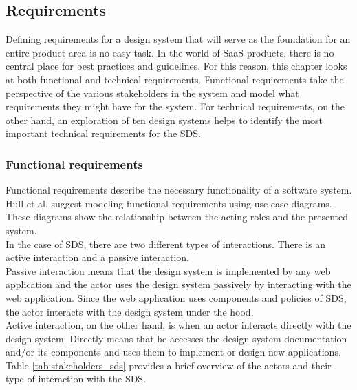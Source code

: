 \subsection{Requirements}
Defining requirements for a design system that will serve as the foundation for an entire product area is no easy task. In the world of SaaS products, there is no central place for best practices and guidelines. For this reason, this chapter looks at both functional and technical requirements. Functional requirements take the perspective of the various stakeholders in the system and model what requirements they might have for the system. For technical requirements, on the other hand, an exploration of ten design systems helps to identify the most important technical requirements for the \ac{SDS}.
\subsubsection{Functional requirements}
Functional requirements describe the necessary functionality of a software system. Hull et al. suggest modeling functional requirements using use case diagrams. These diagrams show the relationship between the acting roles and the presented system.\cite{hull_requirements_2011} \\
In the case of \ac{SDS}, there are two different types of interactions. There is an active interaction and a passive interaction. \\
Passive interaction means that the design system is implemented by any web application and the actor uses the design system passively by interacting with the web application. Since the web application uses components and policies of \ac{SDS}, the actor interacts with the design system under the hood. \\
Active interaction, on the other hand, is when an actor interacts directly with the design system. Directly means that he accesses the design system documentation and/or its components and uses them to implement or design new applications. \\
Table \ref{tab:stakeholders_sds} provides a brief overview of the actors and their type of interaction with the \ac{SDS}.
